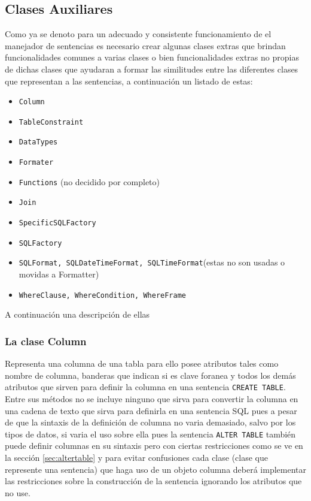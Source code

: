 \subsection{Clases Auxiliares} \label{seccion:disenio:clases-auxiliares}
Como ya se denoto para un adecuado y consistente funcionamiento de el manejador de sentencias es necesario crear algunas clases extras que brindan funcionalidades comunes a varias clases o bien funcionalidades extras no propias de dichas clases que ayudaran a formar las similitudes entre las diferentes clases que representan a las sentencias, a continuación un listado de estas:

\begin{itemize}
\item \verb=Column=
\item \verb=TableConstraint=
\item \verb=DataTypes=
\item \verb=Formater=
\item \verb=Functions= (no decidido por completo)
\item \verb=Join=
\item \verb=SpecificSQLFactory=
\item \verb=SQLFactory=
\item \verb=SQLFormat, SQLDateTimeFormat, SQLTimeFormat=(estas no son usadas o movidas a Formatter)
\item \verb=WhereClause, WhereCondition, WhereFrame=
\end{itemize}
A continuación una descripción de ellas

\subsubsection{La clase Column}
Representa una columna de una tabla para ello posee atributos tales como nombre de columna, banderas que indican si es clave foranea y todos los demás atributos que sirven para definir la columna en una sentencia \verb=CREATE TABLE=. Entre sus métodos no se incluye ninguno que sirva para convertir la columna en una cadena  de texto que sirva para definirla en una sentencia SQL pues a pesar de que la sintaxis de la definición de columna no varia demasiado, salvo por los tipos de datos, si varia el uso sobre ella pues la sentencia \verb=ALTER TABLE= también puede definir columnas en su sintaxis pero con ciertas restricciones como se ve en la sección \ref{sec:altertable} y para evitar confusiones cada clase (clase que represente una sentencia) que haga uso de un objeto columna deberá implementar las restricciones sobre la construcción de la sentencia ignorando los atributos que no use.


